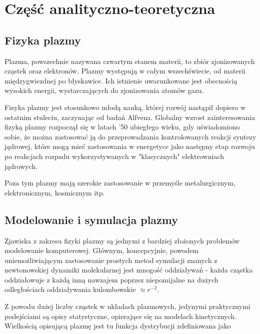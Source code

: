 \section[Część analityczno-teoretyczna]{Część analityczno-teoretyczna} %

\subsection{Fizyka plazmy}

Plazma, powszechnie nazywana czwartym stanem materii, to zbiór zjonizowanych %
cząstek oraz elektronów. Plazmy występują w całym wszechświecie, od materii międzygwiezdnej po błyskawice.
Ich istnienie uwarunkowane jest obecnością wysokich energii, wystarczających do zjonizowania atomów gazu.

Fizyka plazmy jest stosunkowo młodą nauką, której rozwój nastąpił dopiero w ostatnim stuleciu, zaczynając od badań Alfvena. %
Globalny wzrost zainteresowania fizyką plazmy rozpoczął się w latach '50 ubiegłego wieku, %
gdy uświadomiono sobie, że można zastosować ją do przeprowadzania kontrolowanych reakcji syntezy jądrowej, %
które mogą mieć zastosowania w energetyce jako następny etap rozwoju po reakcjach rozpadu wykorzystywanych
w "klasycznych" elektrowniach jądrowych.

Poza tym plazmy mają szerokie zastosowanie w przemyśle metalurgicznym, elektronicznym, kosmicznym itp. %

\subsection{Modelowanie i symulacja plazmy}

Zjawiska z zakresu fizyki plazmy są jednymi z bardziej złożonych problemów modelowanie komputerowej.
Głównym, koncepcyjnie, powodem uniemożliwiającym zastosowanie prostych metod symulacji
znanych z newtonowskiej dynamiki molekularnej jest mnogość oddziaływań - każda cząstka oddziałowuje
z każdą inną nawzajem poprzez niepomijalne na dużych odległościach oddziaływania kulombowskie $\approx r^{-2}$.

Z powodu dużej liczby cząstek w układach plazmowych, jedynymi praktycznymi podejściami są opisy statystyczne,
opierające się na modelach kinetycznych. Wielkością opisującą plazmę jest tu funkcja dystrybucji zdefiniowana jako 


